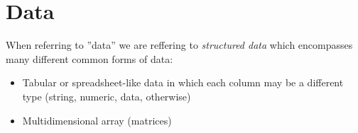 \section{Data}

When referring to ''data'' we are reffering to \textit{structured data} which encompasses many different common forms of data:

\begin{itemize}
    \item Tabular or spreadsheet-like data in which each column may be a different type (string, numeric, data, otherwise)
    \item Multidimensional array (matrices)
\end{itemize}